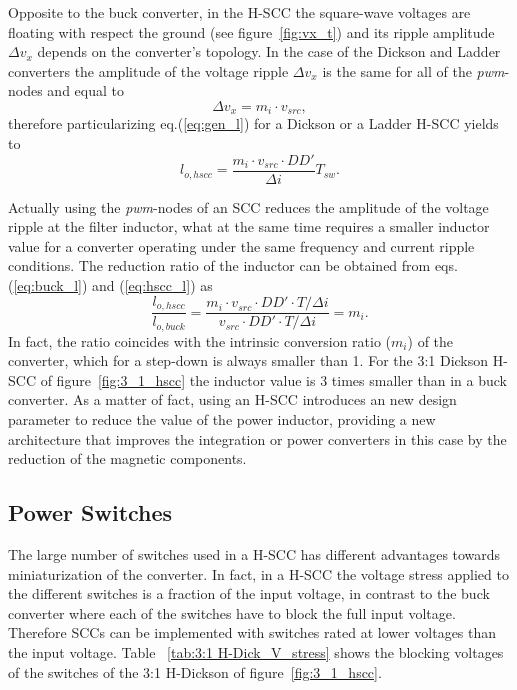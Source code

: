 Opposite to the buck converter, in the H-SCC the square-wave voltages are floating with respect the ground (see figure~\ref{fig:vx_t}) and its ripple amplitude $\Delta v_x$ depends on the converter's topology. In the case of the Dickson and Ladder converters the amplitude of the voltage ripple $\Delta v_x$ is the same for all of the \emph{pwm}-nodes and equal to
\begin{equation}
 \Delta v_x   = m_i \cdot v_{src},
\label{eq:h_scc_Del_vx}
\end{equation}
therefore particularizing eq.(\ref{eq:gen_l}) for a Dickson or a Ladder H-SCC yields to
\begin{equation}
 l_{o,hscc}  = \frac{ m_i \cdot v_{src} \cdot DD'}{\Delta i} T_{sw}.
\label{eq:hscc_l}
\end{equation}

Actually using the \emph{pwm}-nodes of an SCC reduces the amplitude of the voltage ripple at the filter inductor, what at the same time requires a smaller inductor value for a converter operating under the same frequency and current ripple conditions. The reduction ratio of the inductor can be obtained from eqs. (\ref{eq:buck_l}) and (\ref{eq:hscc_l}) as
\begin{equation}
 \frac{l_{o,hscc}}{l_{o,buck}} =  \frac{{ m_i \cdot v_{src} \cdot DD' \cdot T}/{\Delta i} }{{  v_{src} \cdot DD' \cdot T}/{\Delta i}} = m_i.
\label{eq:l_m}
\end{equation}
In fact, the ratio coincides with the intrinsic conversion ratio ($m_i$) of the converter, which for a step-down is always smaller than 1. For the 3:1 Dickson H-SCC of figure~\ref{fig:3_1_hscc} the inductor value is 3 times smaller than in a buck converter. As a matter of fact, using an H-SCC introduces an new design parameter to reduce the value of the power inductor, providing a new architecture that improves the integration or power converters in this case by the reduction of the magnetic components.

\subsection{Power Switches}
The large number of switches used in a H-SCC has different advantages towards miniaturization of the converter. In fact, in a H-SCC the voltage stress applied to the different switches is a fraction of the input voltage, in contrast to the buck converter where each of the switches have to block the full input voltage. Therefore SCCs can be implemented with switches rated at lower voltages than the input voltage. Table ~\ref{tab:3:1 H-Dick_V_stress} shows the blocking voltages of the switches of the 3:1 H-Dickson of figure~\ref{fig:3_1_hscc}.


